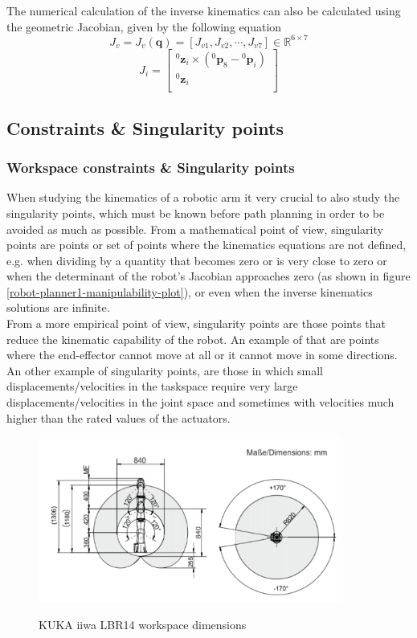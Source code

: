 The numerical calculation of the inverse kinematics can also be calculated using the geometric Jacobian, given by the following equation
\[
J_v = J_v( \mathbf{q} ) = [ J_{v1}, J_{v2}, \cdots, J_{v7} ] \in \mathbb{R}^{6 \times 7}
\]
\begin{equation}
J_i = \begin{bmatrix}
{}^0\mathbf{z}_i \times ({}^0\mathbf{p}_8 - {}^0\mathbf{p}_i) \\
{}^0\mathbf{z}_i \\
\end{bmatrix}
\end{equation}


\subsection{Constraints \& Singularity points}

\subsubsection{Workspace constraints \& Singularity points}

When studying the kinematics of a robotic arm it very crucial to also study the singularity points, which must be known before path planning in order to be avoided as much as possible. From a mathematical point of view, 
singularity points are points or set of points where the kinematics equations are not defined, e.g. when dividing by a quantity that becomes zero or is very close to zero or when the determinant of the robot's Jacobian 
approaches zero (as shown in figure \ref{robot-planner1-manipulability-plot}), or even when the inverse kinematics solutions are infinite. \\

From a more empirical point of view, singularity points are those points that reduce the kinematic capability of the robot. An example of that are points where the end-effector cannot move at all or it cannot move in some 
directions. An other example of singularity points, are those in which small displacements/velocities in the taskspace require very large displacements/velocities in the joint space and sometimes with velocities much higher 
than the rated values of the actuators.

\begin{center}
\begin{figure}[!htb]
\centering
\includegraphics[width=10cm]{images/iiwa-workspace.png}\\
\caption{KUKA iiwa LBR14 workspace dimensions}
\end{figure}
\end{center}

